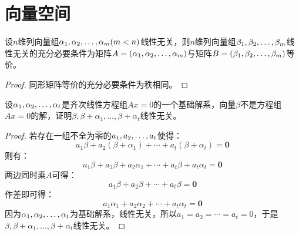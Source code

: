 \chapter{向量空间}

\begin{theorem}
	设$n$维列向量组$\alpha_1, \alpha_2, \dots, \alpha_{m}(m<n)$线性无关，则$n$维列向量组$\beta_1, \beta_2, \dots, \beta_{m}$线性无关的充分必要条件为矩阵$A=(\alpha_1, \alpha_2, \dots, \alpha_{m})$与矩阵$B=(\beta_1, \beta_2, \dots, \beta_{m})$等价。
\end{theorem}
\begin{proof}
	同形矩阵等价的充分必要条件为秩相同。
\end{proof}

\begin{theorem}
	设$\alpha_1, \alpha_2, \dots, \alpha_{t}$是齐次线性方程组$Ax=0$的一个基础解系，向量$\beta$不是方程组$Ax=0$的解，证明$\beta,\beta+\alpha_1,\dots,\beta+\alpha_t$线性无关。
\end{theorem}
\begin{proof}
	若存在一组不全为零的$a_1, a_2, \dots, a_{t}$使得：
	\begin{equation*}
		a_1\beta+a_2(\beta+\alpha_1)+\cdots+a_t(\beta+\alpha_t)=\mathbf{0}
	\end{equation*}
	则有：
	\begin{equation*}
		a_1\beta+a_2\beta+a_2\alpha_1+\cdots+a_t\beta+a_t\alpha_t=\mathbf{0}
	\end{equation*}
	两边同时乘$A$可得：
	\begin{equation*}
		a_1\beta+a_2\beta+\cdots+a_t\beta=\mathbf{0}
	\end{equation*}
	作差即可得：
	\begin{equation*}
		a_1\alpha_1+a_2\alpha_2+\cdots+a_t\alpha_t=\mathbf{0}
	\end{equation*}
	因为$\alpha_1, \alpha_2, \dots, \alpha_{t}$为基础解系，线性无关，所以$a_1=a_2=\cdots=a_t=0$，于是$\beta,\beta+\alpha_1,\dots,\beta+\alpha_t$线性无关。
\end{proof}

